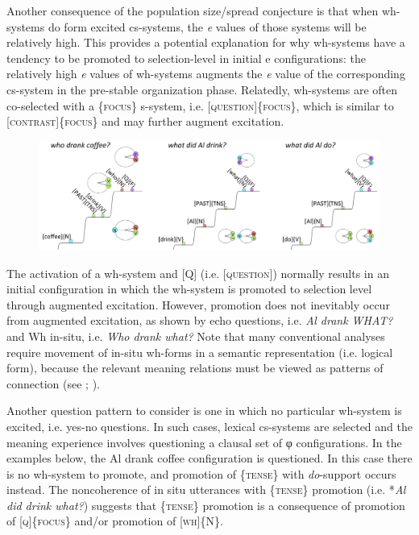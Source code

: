   Another consequence of the population size/spread conjecture is that when wh-systems do form excited cs-systems, the \textit{e} values of those systems will be relatively high. This provides a potential explanation for why wh-systems have a tendency to be promoted to selection-level in initial e configurations: the relatively high \textit{e} values of wh-systems augments the \textit{e} value of the corresponding cs-system in the pre-stable organization phase. Relatedly, wh-systems are often co-selected with a \{\textsc{focus}\} s-system, i.e. [\textsc{question}]\{\textsc{focus}\}, which is similar to [\textsc{contrast}]\{\textsc{focus}\} and may further augment excitation.

  
\begin{figure}
\includegraphics[width=\textwidth]{figures/Tilsen-img159.png}
\caption{\missingcaption}
\label{fig:}
\end{figure}
 

  The activation of a wh-system and [Q] (i.e. [\textsc{question}]) normally results in an initial configuration in which the wh-system is promoted to selection level through augmented excitation. However, promotion does not inevitably occur from augmented excitation, as shown by echo questions, i.e. \textit{Al drank WHAT?} and Wh in-situ, i.e. \textit{Who drank what?} Note that many conventional analyses require movement of in-situ wh-forms in a semantic representation (i.e. logical form), because the relevant meaning relations must be viewed as patterns of connection (see \citealt{Reinhart1998}; \citealt{Watanabe1992}).

  Another question pattern to consider is one in which no particular wh-system is excited, i.e. yes-no questions. In such cases, lexical cs-systems are selected and the meaning experience involves questioning a clausal set of φ configurations. In the examples below, the {\textbar}Al drank coffee{\textbar} configuration is questioned. In this case there is no wh-system to promote, and promotion of \{\textsc{tense}\} with \textit{do}{}-support occurs instead. The noncoherence of in situ utterances with \{\textsc{tense}\} promotion (i.e. *\textit{Al did drink what?}) suggests that \{\textsc{tense}\} promotion is a consequence of promotion of [\textsc{q}]\{\textsc{focus}\} and/or promotion of [\textsc{wh}]\{N\}. 


